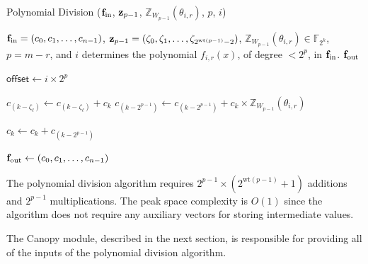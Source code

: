 \begin{algorithm}[h]
	\caption{Polynomial Division (${\bf{f}}_\text{in}$, ${\bf{z}}_{p-1}$, $\mathbb{Z}_{W_{p-1}}(\theta_{i,r})$, $p$, $i$)}
	\label{Algo:Polynomial Division}
	\begin{algorithmic}[1]
		\Require ${\bf{f}}_\text{in} = (c_0,c_1,\ldots,c_{n-1})$, 
		${\bf{z}}_{p-1} = (\zeta_0, \zeta_1, \ldots, \zeta_{2^{\text{wt}(p-1)}-2})$, 
		$\mathbb{Z}_{W_{p-1}}(\theta_{i,r}) \in \mathbb{F}_{2^k}$, 
		$p = m-r$, and $i$ determines the polynomial $f_{i,r}(x)$, of degree $<2^p$, in ${\bf{f}}_\text{in}$.
		\Ensure ${\bf{f}}_\text{out}$
		
		\State $\mathsf{offset} \gets i \times 2^p$ 
		
		 
		\State $c_{(k-\zeta_\ell)} \gets c_{(k-\zeta_\ell)} + c_k$
		\EndFor
		\State $c_{(k-2^{p-1})} \gets c_{(k-2^{p-1})} + c_k \times \mathbb{Z}_{W_{p-1}}(\theta_{i,r})$  \label{Step:CantorLeftSib}
		\EndFor
		
		\State $c_k \gets c_k + c_{(k - 2^{p-1})}$  \label{Step:CantorRightSib}
		\EndFor
		
		\State \Return ${\bf{f}}_\text{out} \gets (c_0,c_1,\ldots,c_{n-1})$
	\end{algorithmic}
\end{algorithm}

The polynomial division algorithm requires \( 2^{p-1} \times \left(2^{\text{wt}({p-1})} + 1\right) \) additions and \( 2^{p-1} \) multiplications. The peak space complexity is \( O(1) \) since the algorithm does not require any auxiliary vectors for storing intermediate values. 


The Canopy module, described in the next section, is responsible for providing all of the inputs of the polynomial division algorithm.





